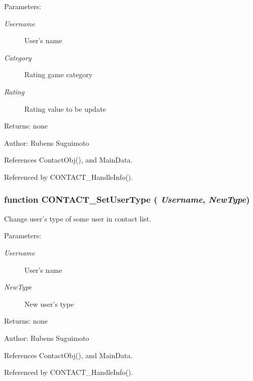 \begin{Desc}
\item[Parameters:]
\begin{description}
\item[{\em Username}]User's name \item[{\em Category}]Rating game category \item[{\em Rating}]Rating value to be update \end{description}
\end{Desc}
\begin{Desc}
\item[Returns:]none \end{Desc}
\begin{Desc}
\item[Author:]Rubens Suguimoto \end{Desc}


References ContactObj(), and MainData.

Referenced by CONTACT\_\-HandleInfo().
\subsubsection[CONTACT\_\-SetUserType]{\setlength{\rightskip}{0pt plus 5cm}function CONTACT\_\-SetUserType ( {\em Username}, \/   {\em NewType})}\label{info_8js_4aa77385acda3e8efe17f6f033bd83a3}


Change user's type of some user in contact list. 

\begin{Desc}
\item[Parameters:]
\begin{description}
\item[{\em Username}]User's name \item[{\em NewType}]New user's type \end{description}
\end{Desc}
\begin{Desc}
\item[Returns:]none \end{Desc}
\begin{Desc}
\item[Author:]Rubens Suguimoto \end{Desc}


References ContactObj(), and MainData.

Referenced by CONTACT\_\-HandleInfo().